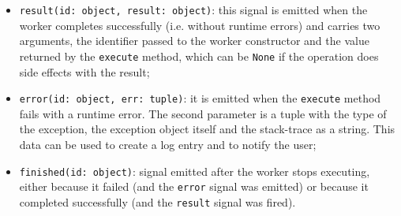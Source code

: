 \begin{itemize}
	\item \texttt{result(id: object, result: object)}: this signal is emitted when the worker completes successfully (i.e. without runtime errors) and carries two arguments, the identifier passed to the worker constructor and the value returned by the \texttt{execute} method, which can be \texttt{None} if the operation does side effects with the result;
	\item \texttt{error(id: object, err: tuple)}: it is emitted when the \texttt{execute} method fails with a runtime error. The second parameter is a tuple with the type of the exception, the exception object itself and the stack-trace as a string. This data can be used to create a log entry and to notify the user;
	\item \texttt{finished(id: object)}: signal emitted after the worker stops executing, either because it failed (and the \texttt{error} signal was emitted) or because it completed successfully (and the \texttt{result} signal was fired).
\end{itemize}


